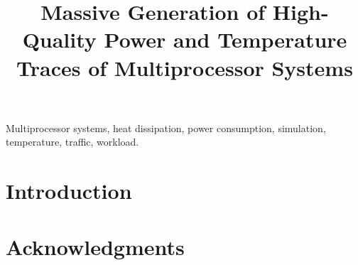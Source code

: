 \documentclass[conference]{IEEEtran}
\title{
  Massive Generation of High-Quality Power and Temperature Traces of
  Multiprocessor Systems
}
\author{}
\begin{document}
  \maketitle

  \begin{abstract}
    
  \end{abstract}

  \begin{IEEEkeywords}
    Multiprocessor systems,
    heat dissipation,
    power consumption,
    simulation,
    temperature,
    traffic,
    workload.
  \end{IEEEkeywords}


  \section{Introduction} 
  

  \section*{Acknowledgments}
  

  \begingroup
    
    
  \endgroup
\end{document}
